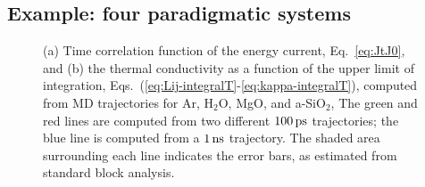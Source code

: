 \begin{LEtext}
\subsection{Example: four paradigmatic systems}  \label{sec:data-analysis-4systems}
\begin{figure}[!tb]
    \begin{center}
        \subfigure[\label{fig:acf-examples}]{****************ESEMPI ARGON - ACQUA - SILICA - MGO ***********} %
        \subfigure[\label{fig:kappa-examples}]{****************ESEMPI ARGON - ACQUA - SILICA - MGO ***********} %
    \end{center}
	\caption{(a) Time correlation function of the energy current, Eq.~\eqref{eq:JtJ0}, and (b) the thermal conductivity as a function of the upper limit of integration, Eqs.~(\ref{eq:Lij-integralT}-\ref{eq:kappa-integralT}), computed from MD trajectories for Ar, H$_2$O, MgO, and a-SiO$_2$,
	The green and red lines are computed from two different $100\,\mathrm{ps}$ trajectories; the blue line is computed from a $1\,\mathrm{ns}$ trajectory.
	The shaded area surrounding each line indicates the error bars, as estimated from standard block analysis.} 
\end{figure}


\end{LEtext}
